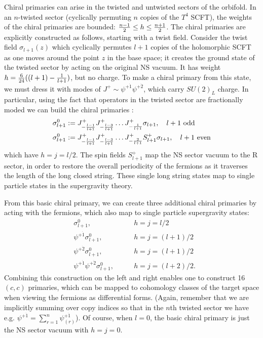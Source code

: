 \documentclass[11pt]{amsart}
\theoremstyle{thm}
\numberwithin{equation}{subsection}
\theoremstyle{def}
\theoremstyle{rem}
\begin{document}
Chiral primaries can arise in the twisted and untwisted sectors of the orbifold. In an $n$-twisted sector (cyclically permuting $n$ copies of the $T^4$ SCFT), the weights of the chiral primaries are bounded: ${n-1 \over 2} \leq h \leq {n+1 \over 2}$. The chiral primaries are explicitly constructed as follows, starting with a twist field. Consider the twist field $\sigma_{l+1}(z)$ which cyclically permutes $l+1$ copies of the holomorphic SCFT as one moves around the point $z$ in the base space; it creates the ground state of the twisted sector by acting on the original NS vacuum. It has weight $h = {6 \over 24}( (l+ 1) - {1 \over l+1})$, but no charge. To make a chiral primary from this state, we must dress it with modes of $J^+ \sim \psi^{+ \dot{1}} \psi^{+ \dot{2}}$, which carry $SU(2)_L$ charge. In particular, using the fact that operators in the twisted sector are fractionally moded we can build the chiral primaries \cite{LuninMathur}:
\begin{align*}
\sigma^0_{l+1}&:=  J^+_{-{l-1 \over l+1}}J^{+}_{-{l-3 \over l+1}} \ldots J^+_{-{1 \over l+1}}\sigma_{l+1}, \ \ \ l+1 \text { odd} \\
\sigma^0_{l+1}&:= J^+_{-{l-1 \over l+1}}J^{+}_{-{l-3 \over l+1}} \ldots J^+_{-{2 \over l+1}}S^+_{l+1}\sigma_{l+1}, \ \ \ l+1 \text { even}
\end{align*} which have $h=j= l/2$. The spin fields $S^+_{l+1}$ map the NS sector vacuum to the R sector, in order to restore the overall periodicity of the fermions as it traverses the length of the long closed string. These single long string states map to single particle states in the supergravity theory. 


From this basic chiral primary, we can create three additional chiral primaries by acting with the fermions, which also map to single particle supergravity states:
\begin{align*}
&\sigma^0_{l+1},  &\qquad h=j= l/2 \\
&\psi^{+ \dot{1}}\sigma^0_{l+1}, &\qquad h=j= (l+1)/2\\
&\psi^{+ \dot{2}}\sigma^0_{l+1} , &\qquad h=j= (l+1)/2\\
&\psi^{+ \dot{1}}\psi^{+ \dot{2}}\sigma^0_{l+1},   &\qquad h=j= (l+2)/2.
\end{align*}
Combining this construction on the left and right enables one to construct 16 $(c,c)$ primaries, which can be mapped to cohomology classes of the target space when viewing the fermions as differential forms. (Again, remember that we are implicitly summing over copy indices so that in the $n$th twisted sector we have e.g. $\psi^{+ \dot{1}} = \sum_{r=1}^n \psi^{+ \dot{1}}_{(r)}$). Of course, when $l=0$, the basic chiral primary is just the NS sector vacuum with $h=j=0$. 
\end{document}
